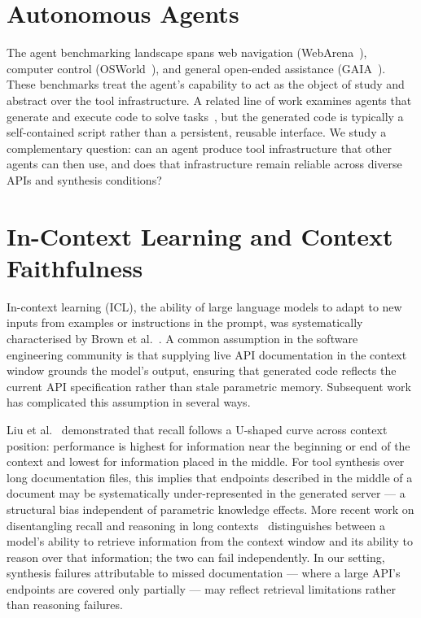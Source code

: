 \documentclass[12pt]{report}
\begin{document}
\section{Autonomous Agents}

The agent benchmarking landscape spans web navigation (WebArena~\cite{webarena2023}),
computer control (OSWorld~\cite{osworld2024}), and general open-ended
assistance (GAIA~\cite{gaia2023}). These benchmarks treat the agent's
capability to act as the object of study and abstract over the tool
infrastructure. A related line of work examines agents that generate and execute
code to solve tasks~\cite{codeact2024}, but the generated code is typically a
self-contained script rather than a persistent, reusable interface. We study a
complementary question: can an agent produce tool infrastructure that other
agents can then use, and does that infrastructure remain reliable across diverse
APIs and synthesis conditions?

\section{In-Context Learning and Context Faithfulness}

In-context learning (ICL), the ability of large language models to adapt to
new inputs from examples or instructions in the prompt, was systematically
characterised by Brown et al.~\cite{brown2020gpt3}. A common assumption in
the software engineering community is that supplying live API documentation
in the context window grounds the model's output, ensuring that generated
code reflects the current API specification rather than stale parametric
memory. Subsequent work has complicated this assumption in several ways.

Liu et al.~\cite{liu2023lostmiddle} demonstrated that recall follows a
U-shaped curve across context position: performance is highest for information
near the beginning or end of the context and lowest for information placed in
the middle. For tool synthesis over long documentation files, this implies
that endpoints described in the middle of a document may be systematically
under-represented in the generated server --- a structural bias independent
of parametric knowledge effects. More recent work on disentangling recall and reasoning in long
contexts~\cite{disentanglerecall2025} distinguishes between a model's ability
to retrieve information from the context window and its ability to reason over
that information; the two can fail independently. In our setting, synthesis failures attributable to missed documentation ---
where a large API's endpoints are covered only partially --- may
reflect retrieval limitations rather than reasoning failures.
\end{document}
